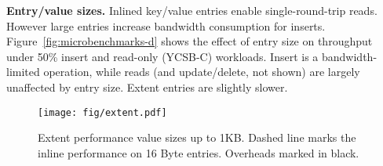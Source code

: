 



\textbf{Entry/value sizes.} \label{sec:entry_size} 
Inlined key/value entries enable single-round-trip
reads. However large entries increase bandwidth consumption for inserts.
Figure~\ref{fig:microbenchmarks-d} shows the effect of entry size on throughput under 50\% insert
and read-only (YCSB-C) workloads. Insert is a bandwidth-limited operation,
while reads (and update/delete, not shown)
are largely unaffected by entry size.
Extent entries are slightly slower.


\begin{figure}
\centering
      \texttt{[image: fig/extent.pdf]}
\caption{Extent performance value sizes up to 1KB. Dashed line marks the inline performance on 16 Byte entries. Overheads marked in black.}
             \label{fig:microbenchmarks-e}
\end{figure}

%
%

